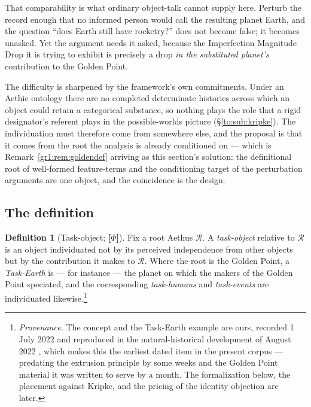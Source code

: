 \documentclass[11pt]{article}
\numberwithin{equation}{section}
\theoremstyle{plain}
\theoremstyle{definition}
\newtheorem{definition}[theorem]{Definition}
\theoremstyle{remark}
\begin{document}
That comparability is what ordinary object-talk cannot supply here.
Perturb the record enough that no informed person would call the
resulting planet Earth, and the question ``does Earth still have
rocketry?'' does not become false; it becomes unasked. Yet the argument
needs it asked, because the Imperfection Magnitude Drop it is trying to
exhibit is precisely a drop \emph{in the substituted planet's}
contribution to the Golden Point.

The difficulty is sharpened by the framework's own commitments. Under an
Aethic ontology there are no completed determinate histories across
which an object could retain a categorical substance, so nothing plays
the role that a rigid designator's referent plays in the possible-worlds
picture (\S\ref{to:sub:kripke}). The individuation must therefore come
from somewhere else, and the proposal is that it comes from the root the
analysis is already conditioned on --- which is
Remark~\ref{gr1:rem:goldendef} arriving as this section's solution:
the definitional root of well-formed feature-terms and the
conditioning target of the perturbation arguments are one object, and
the coincidence is the design.

\subsection{The definition}\label{to:sub:definition}

\begin{definition}[Task-object; \textbf{[$\Phi$]}]\label{to:def:taskobject}
Fix a root Aethus $\mathcal R$. A \emph{task-object} relative to
$\mathcal R$ is an object individuated not by its perceived independence
from other objects but by the contribution it makes to
$\mathcal R$. Where the root is the Golden Point, a \emph{Task-Earth} is
--- for instance --- the planet on which the makers of the Golden Point
speciated, and the corresponding \emph{task-humans} and
\emph{task-events} are individuated likewise.\footnote{%
\emph{Provenance.} The concept and the Task-Earth example are
ours, recorded 1 July 2022 and reproduced in the natural-historical
development of August 2022 \cite{GoldenScience22}, which makes this the
earliest dated item in the present corpus --- predating the extrusion
principle by some weeks and the Golden Point material it was written to
serve by a month. The formalization below, the placement against Kripke,
and the pricing of the identity objection are later.}
\end{definition}
\end{document}
